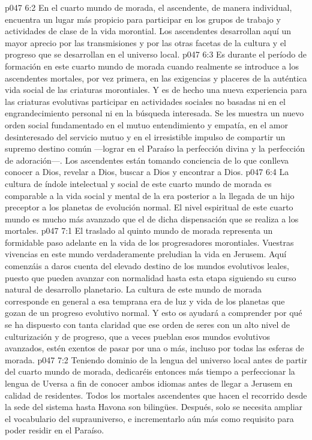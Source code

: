\vs p047 6:2 En el cuarto mundo de morada, el ascendente, de manera individual, encuentra un lugar más propicio para participar en los grupos de trabajo y actividades de clase de la vida morontial. Los ascendentes desarrollan aquí un mayor aprecio por las transmisiones y por las otras facetas de la cultura y el progreso que se desarrollan en el universo local.
\vs p047 6:3 Es durante el período de formación en este cuarto mundo de morada cuando realmente se introduce a los ascendentes mortales, por vez primera, en las exigencias y placeres de la auténtica vida social de las criaturas morontiales. Y es de hecho una nueva experiencia para las criaturas evolutivas participar en actividades sociales no basadas ni en el engrandecimiento personal ni en la búsqueda interesada. Se les muestra un nuevo orden social fundamentado en el mutuo entendimiento y empatía, en el amor desinteresado del servicio mutuo y en el irresistible impulso de compartir un supremo destino común ---lograr en el Paraíso la perfección divina y la perfección de adoración---. Los ascendentes están tomando conciencia de lo que conlleva conocer a Dios, revelar a Dios, buscar a Dios y encontrar a Dios.
\vs p047 6:4 La cultura de índole intelectual y social de este cuarto mundo de morada es comparable a la vida social y mental de la era posterior a la llegada de un hijo preceptor a los planetas de evolución normal. El nivel espiritual de este cuarto mundo es mucho más avanzado que el de dicha dispensación que se realiza a los mortales.
\vs p047 7:1 El traslado al quinto mundo de morada representa un formidable paso adelante en la vida de los progresadores morontiales. Vuestras vivencias en este mundo verdaderamente preludian la vida en Jerusem. Aquí comenzáis a daros cuenta del elevado destino de los mundos evolutivos leales, puesto que pueden avanzar con normalidad hasta esta etapa siguiendo su curso natural de desarrollo planetario. La cultura de este mundo de morada corresponde en general a esa temprana era de luz y vida de los planetas que gozan de un progreso evolutivo normal. Y esto os ayudará a comprender por qué se ha dispuesto con tanta claridad que ese orden de seres con un alto nivel de culturización y de progreso, que a veces pueblan esos mundos evolutivos avanzados, estén exentos de pasar por una o más, incluso por todas las esferas de morada.
\vs p047 7:2 Teniendo dominio de la lengua del universo local antes de partir del cuarto mundo de morada, dedicaréis entonces más tiempo a perfeccionar la lengua de Uversa a fin de conocer ambos idiomas antes de llegar a Jerusem en calidad de residentes. Todos los mortales ascendentes que hacen el recorrido desde la sede del sistema hasta Havona son bilingües. Después, solo se necesita ampliar el vocabulario del suprauniverso, e incrementarlo aún más como requisito para poder residir en el Paraíso.
